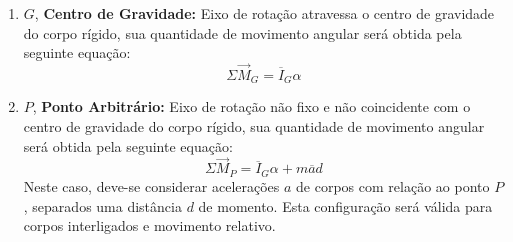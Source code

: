 \documentclass{article}
\begin{document}
                \begin{enumerate}[rightmargin = \leftmargin]
                    \item $G$, \textbf{Centro de Gravidade:} Eixo de rotação atravessa o centro de gravidade do corpo rígido, sua quantidade de movimento angular será obtida pela seguinte equação:
                        \begin{equation}
                            \boxed{
                                \Sigma\vec{M}_{G} = \overline{I}_{G}\alpha
                            }
                        \end{equation}

                    \item $P$, \textbf{Ponto Arbitrário:} Eixo de rotação não fixo e não coincidente com o centro de gravidade do corpo rígido, sua quantidade de movimento angular será obtida pela seguinte equação:
                        \begin{equation}
                            \boxed{
                                \Sigma\vec{M}_{P} = 
                                \overline{I}_{G}\alpha + m\overline{a}d
                            }
                        \end{equation}
                    Neste caso, deve-se considerar acelerações $a$ de corpos com relação ao ponto $P$, separados uma distância $d$ de momento. Esta configuração será válida para corpos interligados e movimento relativo.


\end{enumerate}
\end{document}
